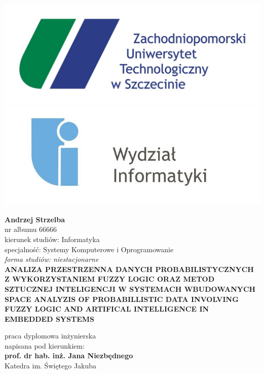 \documentclass[12pt,a4paper,twoside]{book}
\begin{document}

\includegraphics[scale=0.5]{logozut.jpg}
\hfill
\includegraphics[scale=1.1]{logowi.jpg}

\vspace{60pt}
\begin{center} 
	\Large{\textbf{Andrzej Strzelba}}\\
	\vspace{5pt}
	\large{nr albumu 66666}\\
	\vspace{5pt}
	\large{kierunek studiów: Informatyka}\\
	\vspace{5pt}
	\large{specjalność: Systemy Komputerowe i Oprogramowanie}\\
	\vspace{5pt}
	\textit{forma studiów: niestacjonarne}\\
	\vspace{30pt}
	\textbf{\uppercase{ANALIZA PRZESTRZENNA DANYCH PROBABILISTYCZNYCH Z WYKORZYSTANIEM FUZZY LOGIC ORAZ METOD SZTUCZNEJ INTELIGENCJI W SYSTEMACH WBUDOWANYCH}}\\
	\vspace{20pt}
	\textbf{\uppercase{SPACE ANALYZIS OF PROBABILLISTIC DATA INVOLVING FUZZY LOGIC AND ARTIFICAL INTELLIGENCE IN EMBEDDED SYSTEMS}}
	
	\vspace{40pt}
	praca dyplomowa inżynierska\\
	\vspace{10pt}
	napisana pod kierunkiem:\\
	\vspace{10pt}
	\Large{\textbf{prof. dr hab. inż. Jana Niezbędnego}}\\
	\vspace{10pt}
	\large{Katedra im. Świętego Jakuba}\\
\end{center}
\end{document}
